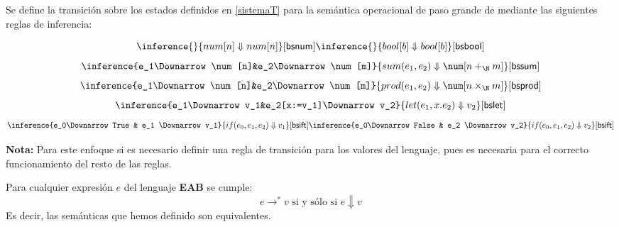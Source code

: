     \begin{definition} Se define la transición sobre los estados definidos en \ref{sistemaT} para la semántica operacional de paso grande de \ea mediante las siguientes reglas de inferencia:
        \begin{description}
            $$\inference{}{num[n]\Downarrow num[n]}[\sf bsnum ] \inference{}{bool[b]\Downarrow bool[b]}[\sf bsbool ]$$
            $$\inference{e_1\Downarrow\num[n]&e_2\Downarrow\num[m]}{sum(e_1,e_2)\Downarrow\num[n+_\N m]}[\sf bssum]$$
            $$\inference{e_1\Downarrow\num[n]&e_2\Downarrow\num[m]}{prod(e_1,e_2)\Downarrow\num[n\times_\N m]}[\sf bsprod]$$
            $$\inference{e_1\Downarrow v_1&e_2[x:=v_1]\Downarrow v_2}{let(e_1,x.e_2)\Downarrow v_2}[\sf bslet]$$
            $$\inference{e_0\Downarrow True & e_1 \Downarrow v_1}{if(e_0,e_1,e_2)\Downarrow v_1}[\sf bsift ]
              \inference{e_0\Downarrow False & e_2 \Downarrow v_2}{if(e_0,e_1,e_2)\Downarrow v_2}[\sf bsift]$$
        \end{description}
        \textbf{Nota: } Para este enfoque si es necesario definir una regla de transición para los valores del lenguaje, pues es necesaria para el correcto funcionamiento del resto de las reglas. 
    \end{definition}

    \begin{theorem} Para cualquier expresión $e$ del lenguaje \textbf{EAB} se cumple:
        $$e\to^*v\mbox{ si y sólo si } e\Downarrow v$$
        Es decir, las semánticas que hemos definido son equivalentes.
    \end{theorem}

